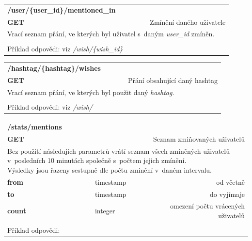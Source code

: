 \documentclass[thesis=B,czech]{FITthesis}[2012/06/26]
\begin{document}
\begin{table}[h]
\begin{tabular}{llllr}
\rowcolor[HTML]{EFEFEF}
\large \textbf{/user/\{user\_id\}/mentioned\_in}        &         &                 &        & \multicolumn{1}{l}{}                \\
\rowcolor[HTML]{EFEFEF}
\textbf{GET}          &         &                 &        & Zmínění daného uživatele                        \\
\multicolumn{5}{l}{\parbox[t]{12.8cm}{Vrací seznam přání, ve kterých byl uživatel s~daným \textit{user\_id} zmíněn. }  } \\  
 & & & & \\
 Příklad odpovědi: viz \textit{/wish/\{wish\_id\}}
\end{tabular}
\end{table}


\begin{table}[h]
\begin{tabular}{llllr}
\rowcolor[HTML]{EFEFEF}
\large \textbf{/hashtag/\{hashtag\}/wishes}        &         &                 &        & \multicolumn{1}{l}{}                \\
\rowcolor[HTML]{EFEFEF}
\textbf{GET}          &         &                 &        & Přání obsahující daný hashtag                       \\
\multicolumn{5}{l}{\parbox[t]{12.8cm}{Vrací seznam přání, ve kterých byl použit daný \textit{hashtag}. }  } \\  
 & & & & \\
 Příklad odpovědi: viz \textit{/wish/}
\end{tabular}
\end{table}

\begin{table}[h]
\begin{tabular}{llllr}
\rowcolor[HTML]{EFEFEF}
\large \textbf{/stats/mentions}        &         &                 &        & \multicolumn{1}{l}{}                \\
\rowcolor[HTML]{EFEFEF}
\textbf{GET}          &         &                 &        & Seznam zmiňovaných uživatelů                        \\
\multicolumn{5}{l}{\parbox[t]{12.8cm}{Bez použití následujích parametrů vrátí seznam všech zmíněných uživatelů v~posledních 10 minutách společně s~počtem jejich zmínění. \\ Výsledky jsou řazeny sestupně dle počtu zmínění v~daném intervalu. }  } \\
\textbf{from}         &         & timestamp       &        & od včetně                           \\
\textbf{to}           &         & timestamp       &        & do vyjímaje                         \\
\textbf{count}        &         & integer         &        & omezení počtu vrácených uživatelů     \\ 
 & & & & \\
 Příklad odpovědi:
\end{tabular}
\end{table}
\end{document}

